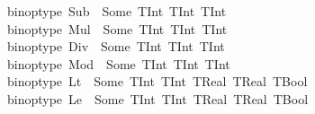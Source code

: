\begin{isabellebody}
\ \ {\isacharbar}{\kern0pt}\ {\isachardoublequoteopen}binop{\isacharunderscore}{\kern0pt}type\ Sub\ {\isacharequal}{\kern0pt}\ Some\ {\isacharparenleft}{\kern0pt}{\isacharbraceleft}{\kern0pt}{\isacharparenleft}{\kern0pt}TInt{\isacharcomma}{\kern0pt}\ TInt{\isacharparenright}{\kern0pt}{\isacharbraceright}{\kern0pt}{\isacharcomma}{\kern0pt}\ TInt{\isacharparenright}{\kern0pt}{\isachardoublequoteclose}\isanewline
\ \ {\isacharbar}{\kern0pt}\ {\isachardoublequoteopen}binop{\isacharunderscore}{\kern0pt}type\ Mul\ {\isacharequal}{\kern0pt}\ Some\ {\isacharparenleft}{\kern0pt}{\isacharbraceleft}{\kern0pt}{\isacharparenleft}{\kern0pt}TInt{\isacharcomma}{\kern0pt}\ TInt{\isacharparenright}{\kern0pt}{\isacharbraceright}{\kern0pt}{\isacharcomma}{\kern0pt}\ TInt{\isacharparenright}{\kern0pt}{\isachardoublequoteclose}\isanewline
\ \ {\isacharbar}{\kern0pt}\ {\isachardoublequoteopen}binop{\isacharunderscore}{\kern0pt}type\ Div\ {\isacharequal}{\kern0pt}\ Some\ {\isacharparenleft}{\kern0pt}{\isacharbraceleft}{\kern0pt}{\isacharparenleft}{\kern0pt}TInt{\isacharcomma}{\kern0pt}\ TInt{\isacharparenright}{\kern0pt}{\isacharbraceright}{\kern0pt}{\isacharcomma}{\kern0pt}\ TInt{\isacharparenright}{\kern0pt}{\isachardoublequoteclose}\isanewline
\ \ {\isacharbar}{\kern0pt}\ {\isachardoublequoteopen}binop{\isacharunderscore}{\kern0pt}type\ Mod\ {\isacharequal}{\kern0pt}\ Some\ {\isacharparenleft}{\kern0pt}{\isacharbraceleft}{\kern0pt}{\isacharparenleft}{\kern0pt}TInt{\isacharcomma}{\kern0pt}\ TInt{\isacharparenright}{\kern0pt}{\isacharbraceright}{\kern0pt}{\isacharcomma}{\kern0pt}\ TInt{\isacharparenright}{\kern0pt}{\isachardoublequoteclose}\isanewline
\ \ {\isacharbar}{\kern0pt}\ {\isachardoublequoteopen}binop{\isacharunderscore}{\kern0pt}type\ Lt\ {\isacharequal}{\kern0pt}\ Some\ {\isacharparenleft}{\kern0pt}{\isacharbraceleft}{\kern0pt}{\isacharparenleft}{\kern0pt}TInt{\isacharcomma}{\kern0pt}\ TInt{\isacharparenright}{\kern0pt}{\isacharcomma}{\kern0pt}\ {\isacharparenleft}{\kern0pt}TReal{\isacharcomma}{\kern0pt}\ TReal{\isacharparenright}{\kern0pt}{\isacharbraceright}{\kern0pt}{\isacharcomma}{\kern0pt}\ TBool{\isacharparenright}{\kern0pt}{\isachardoublequoteclose}\isanewline
\ \ {\isacharbar}{\kern0pt}\ {\isachardoublequoteopen}binop{\isacharunderscore}{\kern0pt}type\ Le\ {\isacharequal}{\kern0pt}\ Some\ {\isacharparenleft}{\kern0pt}{\isacharbraceleft}{\kern0pt}{\isacharparenleft}{\kern0pt}TInt{\isacharcomma}{\kern0pt}\ TInt{\isacharparenright}{\kern0pt}{\isacharcomma}{\kern0pt}\ {\isacharparenleft}{\kern0pt}TReal{\isacharcomma}{\kern0pt}\ TReal{\isacharparenright}{\kern0pt}{\isacharbraceright}{\kern0pt}{\isacharcomma}{\kern0pt}\ TBool{\isacharparenright}{\kern0pt}{\isachardoublequoteclose}\isanewline

\end{isabellebody}
